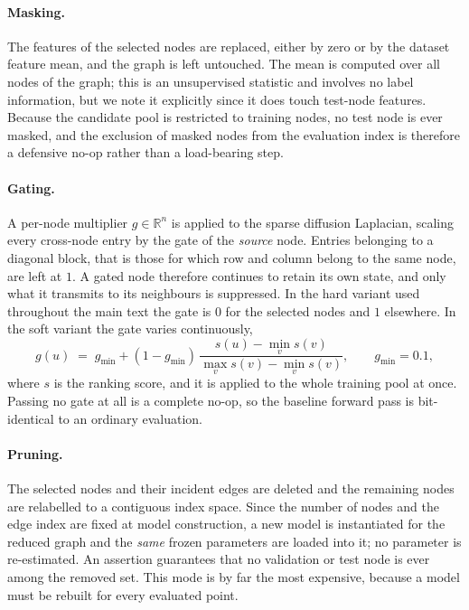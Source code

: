 \paragraph{Masking.}
The features of the selected nodes are replaced, either by zero or by the
dataset feature mean, and the graph is left untouched. The mean is computed over
all nodes of the graph; this is an unsupervised statistic and involves no label
information, but we note it explicitly since it does touch test-node features.
Because the candidate pool is restricted to training nodes, no test node is ever
masked, and the exclusion of masked nodes from the evaluation index is therefore
a defensive no-op rather than a load-bearing step.

\paragraph{Gating.}
A per-node multiplier $g \in \mathbb{R}^{n}$ is applied to the sparse diffusion
Laplacian, scaling every cross-node entry by the gate of the \emph{source} node.
Entries belonging to a diagonal block, that is those for which row and column
belong to the same node, are left at $1$. A gated node therefore continues to
retain its own state, and only what it transmits to its neighbours is
suppressed. In the hard variant used throughout the main text the gate is $0$
for the selected nodes and $1$ elsewhere. In the soft variant the gate varies
continuously,
\[
    g(u) \;=\; g_{\min} + (1 - g_{\min}) \,
    \frac{s(u) - \min_{v} s(v)}{\max_{v} s(v) - \min_{v} s(v)},
    \qquad g_{\min} = 0.1,
\]
where $s$ is the ranking score, and it is applied to the whole training pool at
once. Passing no gate at all is a complete no-op, so the baseline forward pass
is bit-identical to an ordinary evaluation.

\paragraph{Pruning.}
The selected nodes and their incident edges are deleted and the remaining nodes
are relabelled to a contiguous index space. Since the number of nodes and the
edge index are fixed at model construction, a new model is instantiated for the
reduced graph and the \emph{same} frozen parameters are loaded into it; no
parameter is re-estimated. An assertion guarantees that no validation or test
node is ever among the removed set. This mode is by far the most expensive,
because a model must be rebuilt for every evaluated point.

